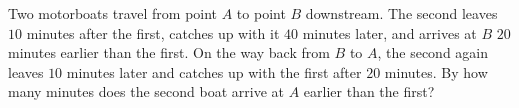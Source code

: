 Two motorboats travel from point $A$ to point $B$ downstream. The second leaves $10$ minutes after the first, catches up with it $40$ minutes later, and arrives at $B$ $20$ minutes earlier than the first. On the way back from $B$ to $A$, the second again leaves $10$ minutes later and catches up with the first after $20$ minutes. By how many minutes does the second boat arrive at $A$ earlier than the first?
